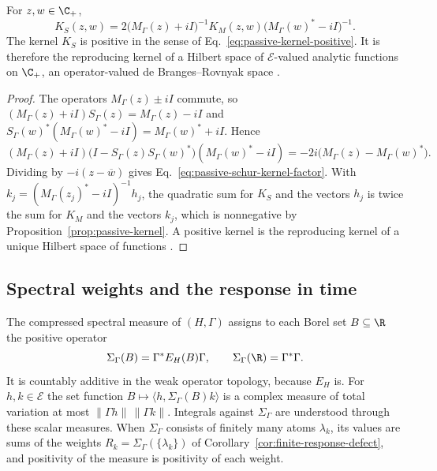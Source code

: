 \begin{proposition}
\label{prop:passive-schur-kernel}
For $z,w\in\C_+$,
\begin{equation}
 K_S(z,w)=2\bigl(M_\Gamma(z)+iI\bigr)^{-1}K_M(z,w)\bigl(M_\Gamma(w)^*-iI\bigr)^{-1}.
 \label{eq:passive-schur-kernel-factor}
\end{equation}
The kernel $K_S$ is positive in the sense of Eq.~\eqref{eq:passive-kernel-positive}. It is therefore the reproducing kernel of a Hilbert space of $\mathcal E$-valued analytic functions on $\C_+$, an operator-valued de Branges--Rovnyak space \cite{Aronszajn,deBrangesRovnyak}.
\end{proposition}
\begin{proof}
The operators $M_\Gamma(z)\pm iI$ commute, so $(M_\Gamma(z)+iI)S_\Gamma(z)=M_\Gamma(z)-iI$ and $S_\Gamma(w)^*(M_\Gamma(w)^*-iI)=M_\Gamma(w)^*+iI$. Hence
\[
 (M_\Gamma(z)+iI)\bigl(I-S_\Gamma(z)S_\Gamma(w)^*\bigr)(M_\Gamma(w)^*-iI)
   =-2i\bigl(M_\Gamma(z)-M_\Gamma(w)^*\bigr).
\]
Dividing by $-i(z-\overline w)$ gives Eq.~\eqref{eq:passive-schur-kernel-factor}. With $k_j=(M_\Gamma(z_j)^*-iI)^{-1}h_j$, the quadratic sum for $K_S$ and the vectors $h_j$ is twice the sum for $K_M$ and the vectors $k_j$, which is nonnegative by Proposition~\ref{prop:passive-kernel}. A positive kernel is the reproducing kernel of a unique Hilbert space of functions \cite{Aronszajn}.
\end{proof}

\subsection{Spectral weights and the response in time}
\label{subsec:passive-spectral}

The compressed spectral measure of $(H,\Gamma)$ assigns to each Borel set $B\subseteq\R$ the positive operator
\begin{equation}
 \Sigma_\Gamma(B)=\Gamma^*E_H(B)\Gamma ,\qquad \Sigma_\Gamma(\R)=\Gamma^*\Gamma .
 \label{eq:passive-spectral-measure}
\end{equation}
It is countably additive in the weak operator topology, because $E_H$ is. For $h,k\in\mathcal E$ the set function $B\mapsto\langle h,\Sigma_\Gamma(B)k\rangle$ is a complex measure of total variation at most $\|\Gamma h\|\,\|\Gamma k\|$. Integrals against $\Sigma_\Gamma$ are understood through these scalar measures. When $\Sigma_\Gamma$ consists of finitely many atoms $\lambda_k$, its values are sums of the weights $R_k=\Sigma_\Gamma(\{\lambda_k\})$ of Corollary~\ref{cor:finite-response-defect}, and positivity of the measure is positivity of each weight.

